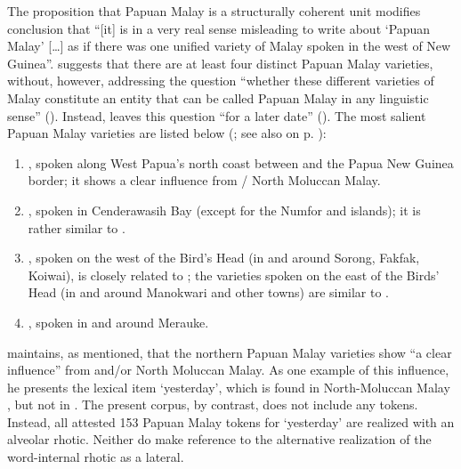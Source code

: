 The proposition that Papuan Malay is a structurally coherent unit modifies  conclusion that  ``[it] is in a very real sense misleading to write about ‘Papuan Malay’ [\ldots] as if there was one unified variety of Malay spoken in the west of New Guinea''. \citeauthor{Donohue.2003} suggests that there are at least four distinct Papuan Malay varieties, without, however, addressing the question  ``whether these different varieties of Malay constitute an entity that can be called Papuan Malay in any linguistic sense'' (\citeyear*[1]{Donohue.2003}). Instead, \citeauthor{Donohue.2003} leaves this question  ``for a later date'' (\citeyear*[2]{Donohue.2003}). The most salient Papuan Malay varieties are listed below (\citeyear*[1--2]{Donohue.2003}; see also  on p. \pageref{Figure_0.2}):

\begin{enumerate}
\item 
{}, spoken along West Papua’s north coast between  and the Papua New Guinea border; it shows a clear influence from  / North Moluccan Malay.

\item 
{}, spoken in Cenderawasih Bay (except for the Numfor and  islands); it is rather similar to .

\item 
{}, spoken on the west of the Bird’s Head (in and around Sorong, Fakfak, Koiwai), is closely related to ; the varieties spoken on the east of the Birds’ Head (in and around Manokwari and other towns) are similar to .

\item 
{}, spoken in and around Merauke.

\end{enumerate}

\citet[2]{Donohue.2003} maintains, as mentioned,{ that the northern Papuan Malay varieties show  ``}a clear influence'' from  and/or North Moluccan Malay. As one example of this influence, he presents the lexical item  ‘yesterday’, which is found in North-Moluccan Malay \citep[3]{Voorhoeve.1983}, but not in . The present corpus, by contrast, does not include any  tokens. Instead, all attested 153 Papuan Malay tokens for ‘yesterday’ are realized with an alveolar rhotic. Neither do \citet{Scott.2008} make reference to the alternative realization of the word-internal rhotic as a lateral.



